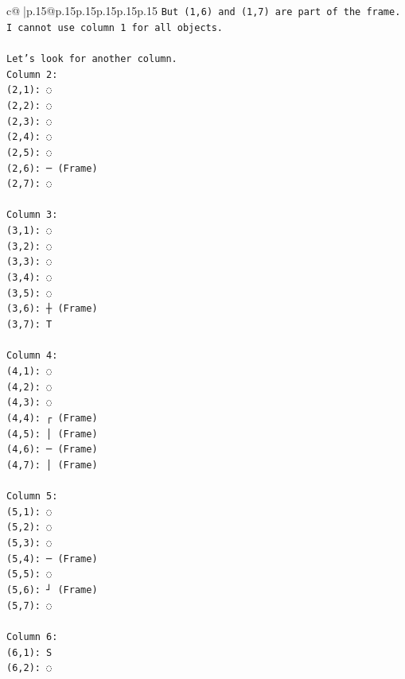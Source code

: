 \documentclass{article}
\begin{document}
{\begin{supertabular}{c@{$\;$}|p{.15\linewidth}@{}p{.15\linewidth}p{.15\linewidth}p{.15\linewidth}p{.15\linewidth}p{.15\linewidth}}
{{{\texttt{But (1,6) and (1,7) are part of the frame. I cannot use column 1 for all objects.} \\
\\ 
\texttt{Let's look for another column.} \\
\texttt{Column 2:} \\
\texttt{(2,1): ◌} \\
\texttt{(2,2): ◌} \\
\texttt{(2,3): ◌} \\
\texttt{(2,4): ◌} \\
\texttt{(2,5): ◌} \\
\texttt{(2,6): ─ (Frame)} \\
\texttt{(2,7): ◌} \\
\\ 
\texttt{Column 3:} \\
\texttt{(3,1): ◌} \\
\texttt{(3,2): ◌} \\
\texttt{(3,3): ◌} \\
\texttt{(3,4): ◌} \\
\texttt{(3,5): ◌} \\
\texttt{(3,6): ┼ (Frame)} \\
\texttt{(3,7): T} \\
\\ 
\texttt{Column 4:} \\
\texttt{(4,1): ◌} \\
\texttt{(4,2): ◌} \\
\texttt{(4,3): ◌} \\
\texttt{(4,4): ┌ (Frame)} \\
\texttt{(4,5): │ (Frame)} \\
\texttt{(4,6): ─ (Frame)} \\
\texttt{(4,7): │ (Frame)} \\
\\ 
\texttt{Column 5:} \\
\texttt{(5,1): ◌} \\
\texttt{(5,2): ◌} \\
\texttt{(5,3): ◌} \\
\texttt{(5,4): ─ (Frame)} \\
\texttt{(5,5): ◌} \\
\texttt{(5,6): ┘ (Frame)} \\
\texttt{(5,7): ◌} \\
\\ 
\texttt{Column 6:} \\
\texttt{(6,1): S} \\
\texttt{(6,2): ◌} \\
}}}
\end{supertabular}}
\end{document}
